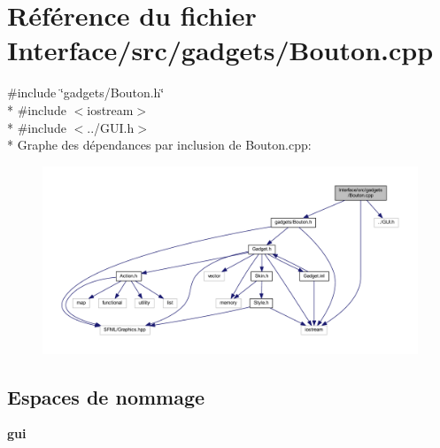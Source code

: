 \section{Référence du fichier Interface/src/gadgets/\+Bouton.cpp}
\label{_bouton_8cpp}
{\ttfamily \#include \char`\"{}gadgets/\+Bouton.\+h\char`\"{}}\\*
{\ttfamily \#include $<$iostream$>$}\\*
{\ttfamily \#include $<$../\+G\+U\+I.\+h$>$}\\*
Graphe des dépendances par inclusion de Bouton.\+cpp\+:\nopagebreak
\begin{figure}[H]
\begin{center}
\leavevmode
\includegraphics[width=350pt]{_bouton_8cpp__incl}
\end{center}
\end{figure}
\subsection*{Espaces de nommage}
\begin{DoxyCompactItemize}
\item 
 {\bf gui}
\end{DoxyCompactItemize}

